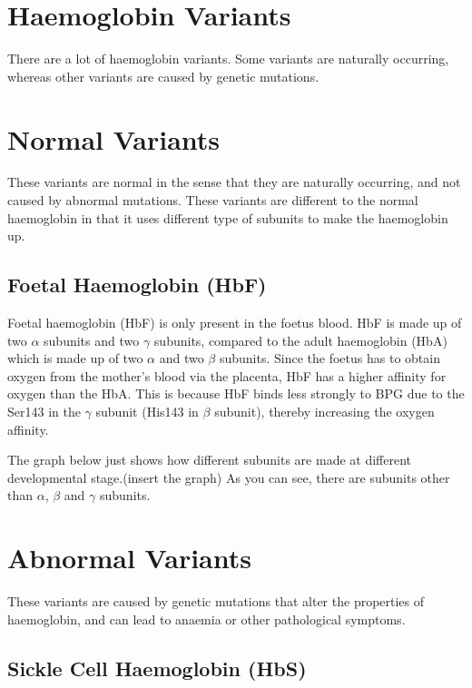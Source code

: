 \section{Haemoglobin Variants}

There are a lot of haemoglobin variants.
Some variants are naturally occurring, whereas other variants are caused by genetic mutations.

\section{Normal Variants}

These variants are normal in the sense that they are naturally occurring, and not caused by abnormal mutations.
These variants are different to the normal haemoglobin in that it uses different type of subunits to make the haemoglobin up.

\subsection{Foetal Haemoglobin (HbF)}

Foetal haemoglobin (HbF) is only present in the foetus blood.
HbF is made up of two $\alpha$ subunits and two $\gamma$ subunits, compared to the adult haemoglobin (HbA) which is made up of two $\alpha$ and two $\beta$ subunits.
Since the foetus has to obtain oxygen from the mother's blood via the placenta, HbF has a higher affinity for oxygen than the HbA.
This is because HbF binds less strongly to BPG due to the Ser143 in the $\gamma$ subunit (His143 in $\beta$ subunit), thereby increasing the oxygen affinity.

The graph below just shows how different subunits are made at different developmental stage.(insert the graph)
As you can see, there are subunits other than $\alpha$, $\beta$ and $\gamma$ subunits.

\section{Abnormal Variants}

These variants are caused by genetic mutations that alter the properties of haemoglobin, and can lead to anaemia or other pathological symptoms.

\subsection{Sickle Cell Haemoglobin (HbS)}

